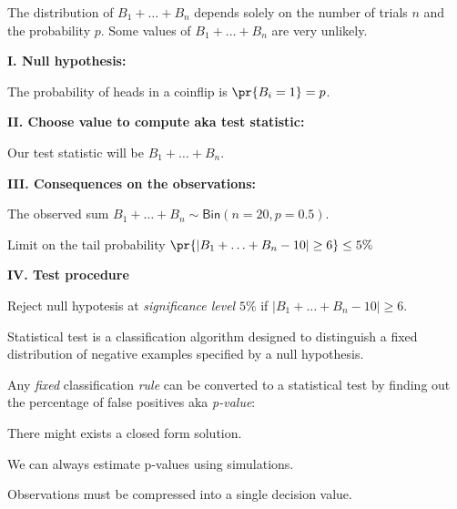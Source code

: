 \documentclass[landscape,footrule]{foils}
\begin{document}

\vspace*{-1cm}

The distribution of  $B_1+\ldots+B_n$ depends solely on the number of trials $n$ and the probability $p$. Some values of $B_1+\ldots+B_n$ are very unlikely.


\textbf{I. Null hypothesis:}
\begin{triangles}
\item The probability of heads in a coinflip is $\pr{B_i=1}=p$.
\end{triangles}
\vspace*{1cm}

\textbf{II. Choose value to compute aka test statistic:} 
\begin{triangles}
\item Our test statistic will be $B_1+\ldots+B_n$.
\end{triangles}
\vspace*{1cm}


\textbf{III. Consequences on the observations:} 
\begin{triangles}
\item The observed sum $B_1+\ldots+B_n\sim\mathsf{Bin}(n=20, p=0.5)$.
\item Limit on the tail probability $\pr{|B_1+\ldots+B_n-10|\geq 6}\leq 5\%$
\end{triangles}
\vspace*{1cm}

\textbf{IV. Test procedure}
\begin{triangles}
\item Reject null hypotesis at \emph{significance level} $5\%$ if $|B_1+\ldots+B_n-10|\geq 6$.  
\end{triangles}
 

Statistical test is a classification algorithm designed to distinguish a fixed distribution of negative examples specified by a null hypothesis.
\vspace*{2ex}

Any \emph{fixed} classification \emph{rule} can be converted to a statistical test by finding out the percentage of false positives aka \emph{p-value}:
\begin{triangles}
\item There might exists a closed form solution.
\item We can always estimate p-values using simulations. 
\item Observations must be compressed into a single decision value.
\end{triangles}
\vspace*{2ex}
\end{document}
